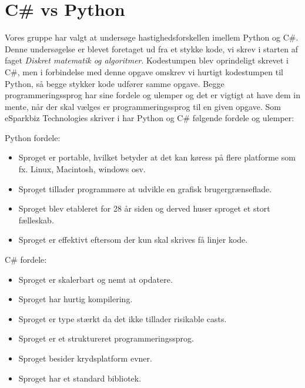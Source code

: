 \documentclass[class=report, crop=false]{standalone}
\begin{document}
    \section{C\# vs Python}
        Vores gruppe har valgt at undersøge hastighedsforskellen imellem Python og C\#. Denne undersøgelse er blevet foretaget ud fra et stykke kode, vi skrev i starten af faget \textit{Diskret matematik og algoritmer}.
        Kodestumpen blev oprindeligt skrevet i C\#, men i forbindelse med denne opgave omskrev vi hurtigt kodestumpen til Python, så begge stykker kode udfører samme opgave.
        Begge programmeringssprog har sine fordele og ulemper og det er vigtigt at have dem in mente, når der skal vælges er programmeringssprog til en given opgave.
        Som eSparkbiz Technologies skriver i \cite{esparkinfo} har Python og C\# følgende fordele og ulemper:
        \begin{multicols}{2}
        \raggedcolumns
        \begin{tcolorbox}
        \noindent\textcolor{ao(english)}{Python fordele:}
        \begin{itemize}
            \setlength{\itemsep}{0pt}
            \setlength{\parskip}{0pt}
            \item Sproget er portable, hvilket betyder at det kan køress på flere platforme som fx. Linux, Macintosh, windows osv.
            \item Sproget tillader programmøre at udvikle en grafisk brugergrænseflade.
            \item Sproget blev etableret for 28 år siden og derved huser sproget et stort fælleskab.
            \item Sproget er effektivt eftersom der kun skal skrives få linjer kode.
        \end{itemize}
        \end{tcolorbox}
        \columnbreak

        \begin{tcolorbox}
        \noindent\textcolor{ao(english)}{C\# fordele:}
        \begin{itemize}
            \setlength{\itemsep}{0pt}
            \setlength{\parskip}{0pt}
            \item Sproget er skalerbart og nemt at opdatere.
            \item Sproget har hurtig kompilering.
            \item Sproget er type stærkt da det ikke tillader risikable casts.
            \item Sproget er et struktureret programmeringssprog.
            \item Sproget besider krydsplatform evner.
            \item Sproget har et standard bibliotek.
        \end{itemize}
        \end{tcolorbox}
        \end{multicols}
\end{document}
